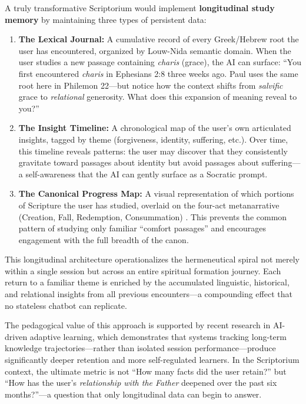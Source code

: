 A truly transformative Scriptorium would implement \textbf{longitudinal study memory} by maintaining three types of persistent data:

\begin{enumerate}
    \item \textbf{The Lexical Journal:} A cumulative record of every Greek/Hebrew root the user has encountered, organized by Louw-Nida \cite{louwnida1988} semantic domain. When the user studies a new passage containing \textit{charis} (grace), the AI can surface: ``You first encountered \textit{charis} in Ephesians 2:8 three weeks ago. Paul uses the same root here in Philemon 22---but notice how the context shifts from \textit{salvific} grace to \textit{relational} generosity. What does this expansion of meaning reveal to you?''
    
    \item \textbf{The Insight Timeline:} A chronological map of the user's own articulated insights, tagged by theme (forgiveness, identity, suffering, etc.). Over time, this timeline reveals patterns: the user may discover that they consistently gravitate toward passages about identity but avoid passages about suffering---a self-awareness that the AI can gently surface as a Socratic prompt.
    
    \item \textbf{The Canonical Progress Map:} A visual representation of which portions of Scripture the user has studied, overlaid on the four-act metanarrative (Creation, Fall, Redemption, Consummation) \cite{goldsworthy1991}. This prevents the common pattern of studying only familiar ``comfort passages'' and encourages engagement with the full breadth of the canon.
\end{enumerate}

This longitudinal architecture operationalizes the hermeneutical spiral \cite{osborne2006} not merely within a single session but across an entire spiritual formation journey. Each return to a familiar theme is enriched by the accumulated linguistic, historical, and relational insights from all previous encounters---a compounding effect that no stateless chatbot can replicate.

The pedagogical value of this approach is supported by recent research in AI-driven adaptive learning, which demonstrates that systems tracking long-term knowledge trajectories---rather than isolated session performance---produce significantly deeper retention and more self-regulated learners. In the Scriptorium context, the ultimate metric is not ``How many facts did the user retain?'' but ``How has the user's \textit{relationship with the Father} deepened over the past six months?''---a question that only longitudinal data can begin to answer.


